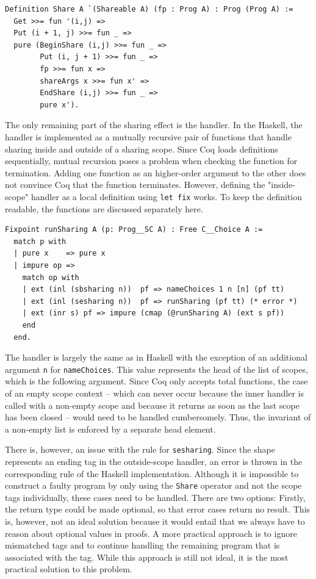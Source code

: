 \documentclass[a4paper, 11pt, fleqn, twoside]{scrreprt}
\newcommand{\cinl}[1]{\texttt{#1}}
\begin{document}
\begin{verbatim}
Definition Share A `(Shareable A) (fp : Prog A) : Prog (Prog A) :=
  Get >>= fun '(i,j) =>
  Put (i + 1, j) >>= fun _ =>
  pure (BeginShare (i,j) >>= fun _ =>
        Put (i, j + 1) >>= fun _ =>
        fp >>= fun x =>
        shareArgs x >>= fun x' =>
        EndShare (i,j) >>= fun _ =>
        pure x').
\end{verbatim}

The only remaining part of the sharing effect is the handler.
In the Haskell, the handler is implemented as a mutually recursive pair of functions that handle sharing inside and outside of a sharing scope.
Since Coq loads definitions sequentially, mutual recursion poses a problem when checking the function for termination.
Adding one function as an higher-order argument to the other does not convince Coq that the function terminates.
However, defining the "inside-scope" handler as a local definition using \cinl{let fix} works.
To keep the definition readable, the functions are discussed separately here.

\begin{verbatim}
Fixpoint runSharing A (p: Prog__SC A) : Free C__Choice A :=
  match p with
  | pure x    => pure x
  | impure op =>
    match op with
    | ext (inl (sbsharing n))  pf => nameChoices 1 n [n] (pf tt)
    | ext (inl (sesharing n))  pf => runSharing (pf tt) (* error *)
    | ext (inr s) pf => impure (cmap (@runSharing A) (ext s pf))
    end
  end.
\end{verbatim}

The handler is largely the same as in Haskell with the exception of an additional argument \cinl{n} for \cinl{nameChoices}.
This value represents the head of the list of scopes, which is the following argument.
Since Coq only accepts total functions, the case of an empty scope context -- which can never occur because the inner handler is called with a non-empty scope and because it returns as soon as the last scope has been closed -- would need to be handled cumbersomely.
Thus, the invariant of a non-empty list is enforced by a separate head element.

There is, however, an issue with the rule for \cinl{sesharing}.
Since the shape represents an ending tag in the outside-scope handler, an error is thrown in the corresponding rule of the Haskell implementation.
Although it is impossible to construct a faulty program by only using the \cinl{Share} operator and not the scope tags individually, these cases need to be handled.
There are two options: Firstly, the return type could be made optional, so that error cases return no result.
This is, however, not an ideal solution because it would entail that we always have to reason about optional values in proofs.
A more practical approach is to ignore mismatched tags and to continue handling the remaining program that is associated with the tag.
While this approach is still not ideal, it is the most practical solution to this problem.
\end{document}
